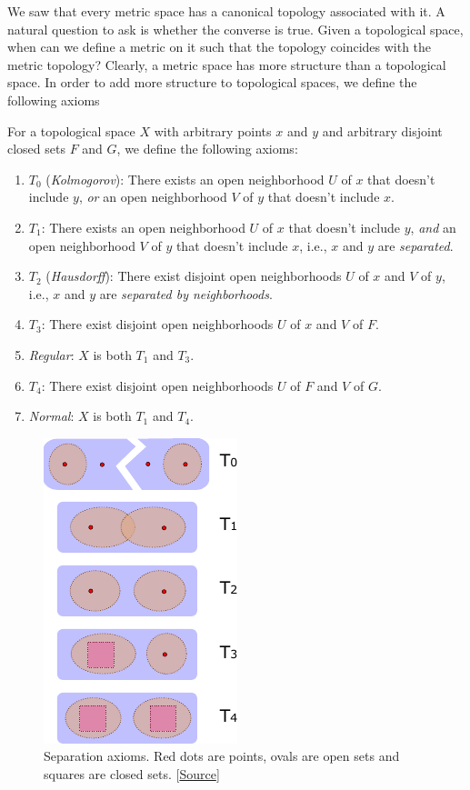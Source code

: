 We saw that every metric space has a canonical topology associated with it. A natural question to ask is whether the converse is true. Given a topological space, when can we define a metric on it such that the topology coincides with the metric topology? Clearly, a metric space has more structure than a topological space. In order to add more structure to topological spaces, we define the following axioms

\begin{defn}
    For a topological space $X$ with arbitrary points $x$ and $y$ and arbitrary disjoint closed sets $F$ and $G$, we define the following axioms:
    \begin{enumerate}
        \item $T_0$ (\emph{Kolmogorov}): There exists an open neighborhood $U$ of $x$ that doesn't include $y$, \emph{or} an open neighborhood $V$ of $y$ that doesn't include $x$. 
        \item $T_1$: There exists an open neighborhood $U$ of $x$ that doesn't include $y$, \emph{and} an open neighborhood $V$ of $y$ that doesn't include $x$, i.e., $x$ and $y$ are \emph{separated}.
        \item $T_2$ (\emph{Hausdorff}): There exist disjoint open neighborhoods $U$ of $x$ and $V$ of $y$, i.e., $x$ and $y$ are \emph{separated by neighborhoods}.
        \item $T_3$: There exist disjoint open neighborhoods $U$ of $x$ and $V$ of $F$.
        \item \emph{Regular}: $X$ is both $T_1$ and $T_3$.
        \item $T_4$: There exist disjoint open neighborhoods $U$ of $F$ and $V$ of $G$.
        \item \emph{Normal}: $X$ is both $T_1$ and $T_4$.
    \end{enumerate}
\end{defn}

\begin{figure}[tp]
    \centering
    \includegraphics[scale=1.0]{figures/separation-axioms.pdf}
    \caption{Separation axioms. Red dots are points, ovals are open sets and squares are closed sets. [\href{http://mathroughguides.wikidot.com/article:point-set-topology}{Source}]}
\end{figure}

